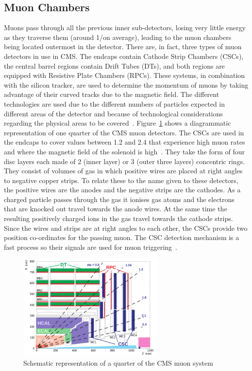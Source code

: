 \subsection{Muon Chambers}
\label{ss:Muon_Chambers}
Muons pass through all the previous inner sub-detectors, losing very little energy as they traverse them
(around 1\MeV/\mm on average), leading to the muon chambers being located outermost in the detector. There
are, in fact, three types of muon detectors in use in CMS. The endcaps contain Cathode Strip Chambers (CSCs),
the central barrel regions contain Drift Tubes (DTs), and both regions are equipped with Resistive Plate
Chambers (RPCs). These systems, in combination with the silicon tracker, are used to determine the momentum of
muons by taking advantage of their curved tracks due to the magnetic field. The different technologies are
used due to the different numbers of particles expected in different areas of the detector and because of
technological considerations regarding the physical areas to be covered~\cite{CMS_TDR1}.
Figure~\ref{fig:CMS_muon_system} shows a diagrammatic representation of one quarter of the CMS muon detectors.
The CSCs are used in the endcaps to cover \abseta values between 1.2 and 2.4 that experience high muon rates
and where the magnetic field of the solenoid is high~\cite{CMS_TDR1}. They take the form of four disc layers
each made of 2 (inner layer) or 3 (outer three layers) concentric rings. They consist of volumes of gas in
which positive wires are placed at right angles to negative copper strips. To relate these to the name given
to these detectors, the positive wires are the anodes and the negative strips are the cathodes. As a charged
particle passes through the gas it ionises gas atoms and the electrons that are knocked out travel towards the
anode wires. At the same time the resulting positively charged ions in the gas travel towards the cathode
strips. Since the wires and strips are at right angles to each other, the CSCs provide two position
co-ordinates for the passing muon. The CSC detection mechanism is a fast process so their signals are used for
muon triggering~\cite{CMS_experiment}.
 
\begin{figure}[hbtp]
   \centering
     \includegraphics[width=0.65\textwidth]{Chapters/02_Detector/Images/MuonSys-mod3.png}\hfill
     \caption[Schematic representation of a quarter of the CMS muon system.]{Schematic representation of a
     quarter of the CMS muon system \cite{Muon_tracking}}
     \label{fig:CMS_muon_system}
\end{figure}


